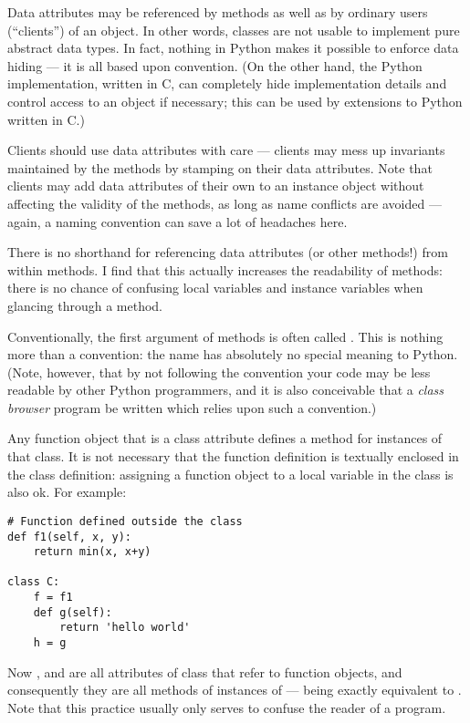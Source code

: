 \documentclass{manual}
\begin{document}
Data attributes may be referenced by methods as well as by ordinary
users (``clients'') of an object.  In other words, classes are not
usable to implement pure abstract data types.  In fact, nothing in
Python makes it possible to enforce data hiding --- it is all based
upon convention.  (On the other hand, the Python implementation,
written in C, can completely hide implementation details and control
access to an object if necessary; this can be used by extensions to
Python written in C.)


Clients should use data attributes with care --- clients may mess up
invariants maintained by the methods by stamping on their data
attributes.  Note that clients may add data attributes of their own to
an instance object without affecting the validity of the methods, as
long as name conflicts are avoided --- again, a naming convention can
save a lot of headaches here.


There is no shorthand for referencing data attributes (or other
methods!) from within methods.  I find that this actually increases
the readability of methods: there is no chance of confusing local
variables and instance variables when glancing through a method.


Conventionally, the first argument of methods is often called
.  This is nothing more than a convention: the name
 has absolutely no special meaning to Python.  (Note,
however, that by not following the convention your code may be less
readable by other Python programmers, and it is also conceivable that
a \emph{class browser} program be written which relies upon such a
convention.)


Any function object that is a class attribute defines a method for
instances of that class.  It is not necessary that the function
definition is textually enclosed in the class definition: assigning a
function object to a local variable in the class is also ok.  For
example:

\begin{verbatim}
# Function defined outside the class
def f1(self, x, y):
    return min(x, x+y)

class C:
    f = f1
    def g(self):
        return 'hello world'
    h = g
\end{verbatim}

Now ,  and  are all attributes of class
 that refer to function objects, and consequently they are all
methods of instances of  ---  being exactly equivalent
to .  Note that this practice usually only serves to confuse
the reader of a program.
\end{document}
